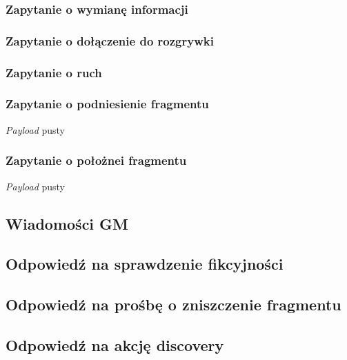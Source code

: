 \documentclass[Dokumentacja.tex]{subfiles}
\begin{document}
\subsubsection{Zapytanie o wymianę informacji}


\subsubsection{Zapytanie o dołączenie do rozgrywki}


\subsubsection{Zapytanie o ruch}


\subsubsection{Zapytanie o podniesienie fragmentu}
\textit{Payload} pusty


\subsubsection{Zapytanie o położnei fragmentu}
\textit{Payload} pusty



\subsection{Wiadomości GM}
\subsection{Odpowiedź na sprawdzenie fikcyjności}


\subsection{Odpowiedź na prośbę o zniszczenie fragmentu}


\subsection{Odpowiedź na akcję discovery}

\end{document}
